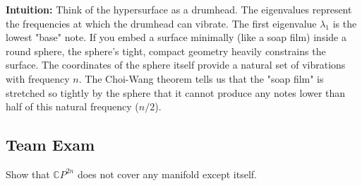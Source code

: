 \begin{solution}
\textbf{Intuition:}
Think of the hypersurface as a drumhead. The eigenvalues represent the frequencies at which the drumhead can vibrate. The first eigenvalue $\lambda_1$ is the lowest "base" note. If you embed a surface minimally (like a soap film) inside a round sphere, the sphere's tight, compact geometry heavily constrains the surface. The coordinates of the sphere itself provide a natural set of vibrations with frequency $n$. The Choi-Wang theorem tells us that the "soap film" is stretched so tightly by the sphere that it cannot produce any notes lower than half of this natural frequency ($n/2$).
\end{solution}

\subsection{Team Exam}

\begin{exercise}
\label{geometry:2016:7}
Show that $\mathbb{C}P^{2n}$ does not cover any manifold except itself.
\end{exercise}

